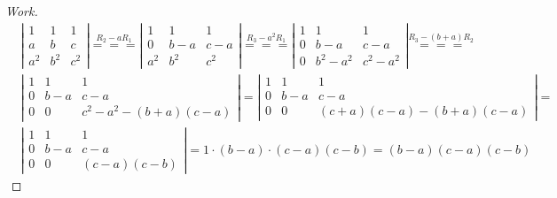\documentclass{article}
\begin{document}
\begin{proof}[Work]
    \begin{align*}
         & \left\lvert\begin{array}{ccc}
                          1   & 1   & 1   \\
                          a   & b   & c   \\
                          a^2 & b^2 & c^2
                      \end{array} \right\rvert \overset{R_2 - aR_1}{===}
        \left\lvert\begin{array}{ccc}
                       1   & 1   & 1   \\
                       0   & b-a & c-a \\
                       a^2 & b^2 & c^2
                   \end{array} \right\rvert \overset{R_3 - a^2R_1}{===}
        \left\lvert\begin{array}{ccc}
                       1 & 1       & 1       \\
                       0 & b-a     & c-a     \\
                       0 & b^2-a^2 & c^2-a^2
                   \end{array} \right\rvert \overset{R_3 - (b+a)R_2}{===}                         \\
         & \left\lvert\begin{array}{ccc}
                          1 & 1   & 1                    \\
                          0 & b-a & c-a                  \\
                          0 & 0   & c^2-a^2 - (b+a)(c-a)
                      \end{array} \right\rvert =
        \left\lvert\begin{array}{ccc}
                       1 & 1   & 1                       \\
                       0 & b-a & c-a                     \\
                       0 & 0   & (c+a)(c-a) - (b+a)(c-a)
                   \end{array} \right\rvert =                                              \\
         & \left\lvert\begin{array}{ccc}
                          1 & 1   & 1          \\
                          0 & b-a & c-a        \\
                          0 & 0   & (c-a)(c-b)
                      \end{array} \right\rvert = 1 \cdot (b-a) \cdot (c-a)(c-b) = (b-a)(c-a)(c-b)
    \end{align*}
\end{proof}
\qdash
\end{document}
